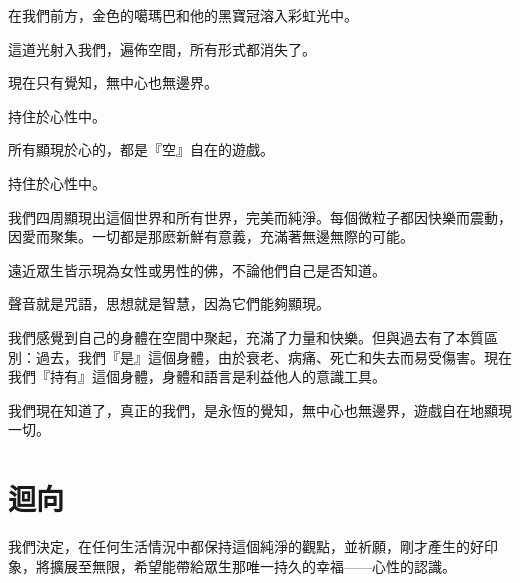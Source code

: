 \documentclass[a6paper,10pt]{ctexbook}
\newcommand{\remark}[1]{\vspace*{2pt} \textsf{#1}\vspace*{2pt}}
\begin{document}
在我們前方，金色的噶瑪巴和他的黑寶冠溶入彩虹光中。

這道光射入我們，遍佈空間，所有形式都消失了。

現在只有覺知，無中心也無邊界。

\remark{持住於心性中。}

所有顯現於心的，都是『空』自在的遊戲。

\remark{持住於心性中。}

我們四周顯現出這個世界和所有世界，完美而純淨。每個微粒子都因快樂而震動，因愛而聚集。一切都是那麽新鮮有意義，充滿著無邊無際的可能。

遠近眾生皆示現為女性或男性的佛，不論他們自己是否知道。

聲音就是咒語，思想就是智慧，因為它們能夠顯現。

我們感覺到自己的身體在空間中聚起，充滿了力量和快樂。但與過去有了本質區別：過去，我們『是』這個身體，由於衰老、病痛、死亡和失去而易受傷害。現在我們『持有』這個身體，身體和語言是利益他人的意識工具。

我們現在知道了，真正的我們，是永恆的覺知，無中心也無邊界，遊戲自在地顯現一切。

\section*{迴向}

我們決定，在任何生活情況中都保持這個純淨的觀點，並祈願，剛才產生的好印象，將擴展至無限，希望能帶給眾生那唯一持久的幸福——心性的認識。
\newpage
\theendnotes
\end{document}
